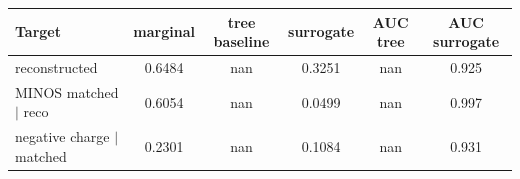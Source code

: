 \begin{tabular}{lccccc}
\toprule
Target & marginal & tree baseline & surrogate & AUC tree & AUC surrogate \\
\midrule
reconstructed & 0.6484 & nan & 0.3251 & nan & 0.925 \\
MINOS matched $\mid$ reco & 0.6054 & nan & 0.0499 & nan & 0.997 \\
negative charge $\mid$ matched & 0.2301 & nan & 0.1084 & nan & 0.931 \\
\bottomrule
\end{tabular}
